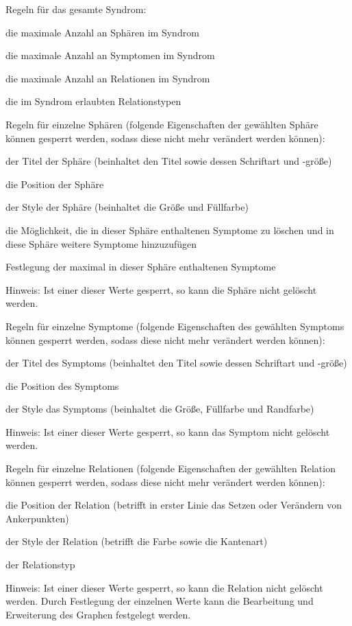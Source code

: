 \documentclass[enabledeprecatedfontcommands,fontsize=11pt,paper=a4,twoside]{scrartcl}
\newcounter{one}
\newcounter{two}[one]
\let\tempone\itemize
\let\temptwo\enditemize
\renewenvironment{itemize}{\tempone\addtolength{\itemsep}{-10.0pt}}{\temptwo}
\let\origenumerate\enumerate
\let\origendenumerate\endenumerate
\renewenvironment{enumerate}{\origenumerate \addtolength{\itemsep}{-10.0pt}}{\origendenumerate}
\begin{document}
\begin{itemize}
\item Regeln für das gesamte Syndrom:
\begin{enumerate}
\item die maximale Anzahl an Sphären im Syndrom
\item die maximale Anzahl an Symptomen im Syndrom 
\item die maximale Anzahl an Relationen im Syndrom
\item die im Syndrom erlaubten Relationstypen
\end{enumerate}
\item Regeln für einzelne Sphären (folgende Eigenschaften der gewählten Sphäre können gesperrt werden, sodass diese nicht mehr verändert werden können):
\begin{enumerate}
\item der Titel der Sphäre (beinhaltet den Titel sowie dessen Schriftart und -größe)
\item die Position der Sphäre
\item der Style der Sphäre (beinhaltet die Größe und Füllfarbe)
\item die Möglichkeit, die in dieser Sphäre enthaltenen Symptome zu löschen und in diese Sphäre weitere Symptome hinzuzufügen
\item Festlegung der maximal in dieser Sphäre enthaltenen Symptome
\item Hinweis: Ist einer dieser Werte gesperrt, so kann die Sphäre nicht gelöscht werden.
\end{enumerate}
\item Regeln für einzelne Symptome (folgende Eigenschaften des gewählten Symptoms können gesperrt werden, sodass diese nicht mehr verändert werden können):
\begin{enumerate}
\item der Titel des Symptoms (beinhaltet den Titel sowie dessen Schriftart und -größe)
\item die Position des Symptoms
\item der Style das Symptoms (beinhaltet die Größe, Füllfarbe und Randfarbe)
\item Hinweis: Ist einer dieser Werte gesperrt, so kann das Symptom nicht gelöscht werden.
\end{enumerate}
\item Regeln für einzelne Relationen (folgende Eigenschaften der gewählten Relation können gesperrt werden, sodass diese nicht mehr verändert werden können):
\begin{enumerate}
\item die Position der Relation (betrifft in erster Linie das Setzen oder Verändern von Ankerpunkten)
\item der Style der Relation (betrifft die Farbe sowie die Kantenart)
\item der Relationstyp
\item Hinweis: Ist einer dieser Werte gesperrt, so kann die Relation nicht gelöscht werden.
\end{enumerate}
\end{itemize}
Durch Festlegung der einzelnen Werte kann die Bearbeitung und Erweiterung des Graphen festgelegt werden.
\end{document}
